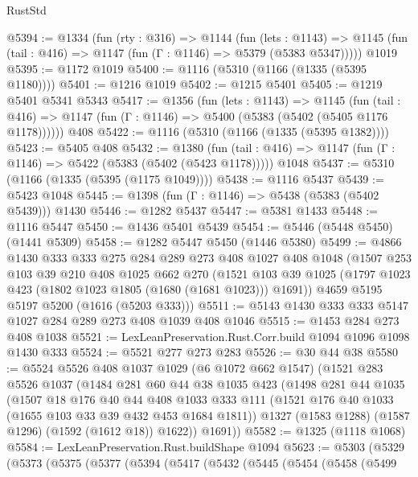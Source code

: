 \begin{lexlean}{RustStd}
\begin{coremodule}
@5394 := @1334
    (fun (rty : @316) =>
    @1144
      (fun (lets : @1143) =>
      @1145 (fun (tail : @416) => @1147 (fun (Γ : @1146) => @5379 (@5383 @5347)))))
    @1019
@5395 := @1172 @1019
@5400 := @1116 (@5310 (@1166 (@1335 (@5395 @1180))))
@5401 := @1216 @1019
@5402 := @1215 @5401
@5405 := @1219 @5401 @5341 @5343
@5417 := @1356
    (fun (lets : @1143) =>
    @1145
      (fun (tail : @416) => @1147 (fun (Γ : @1146) => @5400 (@5383 (@5402 (@5405 @1176 @1178))))))
    @408
@5422 := @1116 (@5310 (@1166 (@1335 (@5395 @1382))))
@5423 := @5405 @408
@5432 := @1380
    (fun (tail : @416) => @1147 (fun (Γ : @1146) => @5422 (@5383 (@5402 (@5423 @1178)))))
    @1048
@5437 := @5310 (@1166 (@1335 (@5395 (@1175 @1049))))
@5438 := @1116 @5437
@5439 := @5423 @1048
@5445 := @1398 (fun (Γ : @1146) => @5438 (@5383 (@5402 @5439))) @1430
@5446 := @1282 @5437
@5447 := @5381 @1433
@5448 := @1116 @5447
@5450 := @1436 @5401 @5439
@5454 := @5446 (@5448 @5450) (@1441 @5309)
@5458 := @1282 @5447 @5450 (@1446 @5380)
@5499 := @4866
    @1430
    @333
    @333
    @275
    @284
    @289
    @273
    @408
    @1027
    @408
    @1048
    (@1507
      @253
      @103
      @39
      @210
      @408
      @1025
      @662
      @270
      (@1521 @103 @39 @1025 (@1797 @1023 @423 (@1802 @1023 @1805 (@1680 (@1681 @1023))) @1691))
      @4659
      @5195
      @5197
      @5200
      (@1616 (@5203 @333)))
@5511 := @5143 @1430 @333 @333 @5147 @1027 @284 @289 @273 @408 @1039 @408 @1046
@5515 := @1453 @284 @273 @408 @1038
@5521 := LexLeanPreservation.Rust.Corr.build @1094 @1096 @1098 @1430 @333
@5524 := @5521 @277 @273 @283
@5526 := @30 @44 @38
@5580 := @5524
    @5526
    @408
    @1037
    @1029
    (@6 @1072 @662 @1547)
    (@1521
      @283
      @5526
      @1037
      (@1484
        @281
        @60
        @44
        @38
        @1035
        @423
        (@1498
          @281
          @44
          @1035
          (@1507
            @18
            @176
            @40
            @44
            @408
            @1033
            @333
            @111
            (@1521 @176 @40 @1033 (@1655 @103 @33 @39 @432 @453 @1684 @1811))
            @1327
            (@1583 @1288)
            (@1587 @1296)
            (@1592 (@1612 @18))
            @1622))
        @1691))
@5582 := @1325 (@1118 @1068)
@5584 := LexLeanPreservation.Rust.buildShape @1094
@5623 := @5303
    (@5329
      (@5373
        (@5375
          (@5377
            (@5394
              (@5417
                (@5432
                  (@5445
                    (@5454
                      (@5458
                        (@5499

\end{coremodule}
\end{lexlean}
